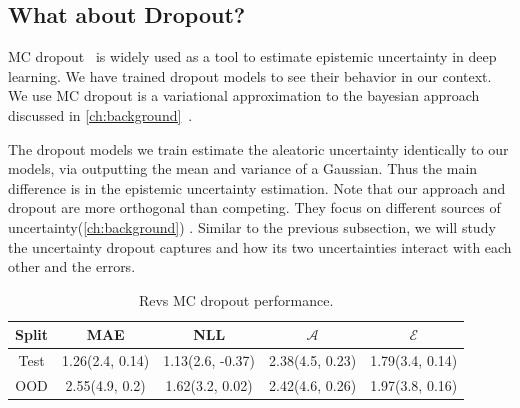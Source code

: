 \clearpage
\subsection{What about Dropout?}

MC dropout~\citep{gal2016dropout} is widely used as a tool to estimate epistemic uncertainty in deep learning. We have trained dropout models to see their behavior in our context. We use MC dropout is a variational approximation to the bayesian approach discussed in \cref{ch:background}~\citep{gal2016dropout}. 

The dropout models we train estimate the aleatoric uncertainty identically to our models, via outputting the mean and variance of a Gaussian. Thus the main difference is in the epistemic uncertainty estimation. Note that our approach and dropout are more orthogonal than competing. They focus on different sources of uncertainty(\ref{ch:background}) . Similar to the previous subsection, we will study the uncertainty dropout captures and how its two uncertainties interact with each other and the errors.

\begin{table}[htbp]
\centering
    \begin{tabular}{c  c  c   c  c }  
        \toprule
        Split & MAE & NLL & $\mathcal{A}$ & $\mathcal{E}$\\
        \midrule
        Test &  1.26(2.4, 0.14) & 1.13(2.6, -0.37) & 2.38(4.5, 0.23) &  1.79(3.4, 0.14) \\
        OOD  &  2.55(4.9, 0.2)&  1.62(3.2, 0.02)& 2.42(4.6, 0.26)&  1.97(3.8, 0.16) \\
        \midrule
    \end{tabular}
    \caption[Revs MC dropout performance.]{Revs MC dropout performance.}
    \label{tbl:revs_dropout}
\end{table}


